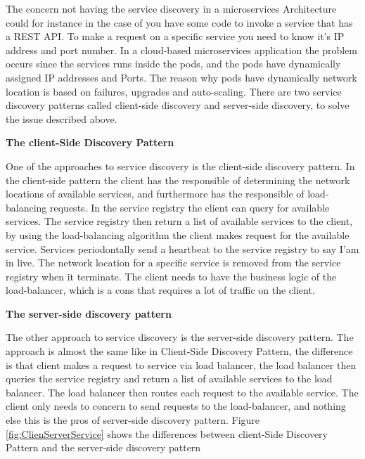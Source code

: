 The concern not having the service discovery in a microservices Architecture could for instance in the case of you have some code to invoke a service that has a REST API. To make a request on a specific service you need to know it's IP address and port number. In a cloud-based microservices application the problem occurs since the services runs inside the pods, and the pods have dynamically assigned IP addresses and Ports. The reason why pods have dynamically network location is based on failures, upgrades and auto-scaling. There are two service discovery patterns called client-side discovery and server-side discovery, to solve the issue described above.         

\textbf{The client-Side Discovery Pattern}

One of the approaches to service discovery is the client-side discovery pattern. In the client-side pattern the client has the responsible of determining the network locations of available services, and furthermore has the responsible of load-balancing requests. In the service registry the client can query for available services. The service registry then return a list of available services to the client, by using the load-balancing algorithm the client makes request for the available service. Services periodontally send a heartbeat to the service registry to say I'am in live. The network location for a specific service is removed from the service registry when it terminate. The client needs to have the business logic of the load-balancer, which is a cons that requires a lot of traffic on the client.

\textbf{The server-side discovery pattern}

The other approach to service discovery is the server-side discovery pattern. The approach is almost the same like in Client-Side Discovery Pattern, the difference is that client makes a request to service via load balancer, the load balancer then queries the service registry and return a list of available services to the load balancer. The load balancer then routes each request to the available service. The client only needs to concern to send requests to the load-balancer, and nothing else this is the pros of server-side discovery pattern.    Figure \ref{fig:ClienServerService} shows the differences between client-Side Discovery Pattern and the server-side discovery pattern  



